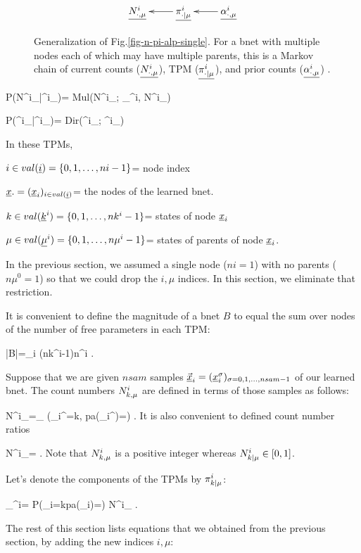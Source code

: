 \begin{figure}[h!]
$$
\xymatrix{
\ul{N^i_\dotmu}
&\ul{\pi^i_\dotbarmu}\ar[l]
&
\ul{\alp^i_\dotmu}\ar[l]
}$$
\caption{
Generalization
of Fig.\ref{fig-n-pi-alp-single}.
For a bnet with multiple nodes
each of which may have multiple parents,
this is  a
Markov chain of
current counts ($\ul{N^i_\dotmu}$),
TPM ($\ul{\pi^i_\dotbarmu}$),
and
prior counts ($\ul{\alp^i_\dotmu}$)
.}
\label{fig-n-pi-alp-many}
\end{figure}

\beq\color{blue}
P(N^i_\dotmu|\pi^i_\dotbarmu)=
Mul(N^i_\dotmu;
\pi_\dotbarmu^i, N^i_\plusmu)
\eeq

\beq\color{blue}
P(\pi^i_\dotbarmu|\alp^i_\dotmu)=
Dir(\pi^i_\dotbarmu; \alp^i_\dotmu)
\eeq

In these TPMs,

$i\in
val(\rvi)=\{0, 1, \dots, ni-1\}$= node index

$\rvx.=(\rvx_i)_{i\in val(\rvi)}$= the
nodes of the learned bnet.

$k\in
val(\rvk^i)=\{0, 1, \dots, nk^i-1\}$= states
of node $\rvx_i$

$\mu\in
val(\ul{\mu}^i)=\{0, 1, \dots, n\mu^i-1\}$=
states of parents of node $\rvx_i$.

In the previous section,
we assumed a single node ($ni=1$)
with no parents ($n\mu^0=1$)
so that 
we could drop  the $i, \mu$
indices.
In this section, we eliminate
that restriction.


It is 
convenient
to define the magnitude of a  bnet
 $B$
to equal the sum
over nodes of the number 
of free parameters in each TPM:

\beq
|B|=\sum_i
(nk^i-1)n\mu^i
\;.
\eeq

Suppose that 
we are given $nsam$ samples 
$
\vec{\rvx}_i=
(\rvx_i^\s)_
{\sigma=0, 1, \ldots, nsam-1}
$ of 
our learned bnet. The count numbers
$N^i_{k,\mu}$ are defined 
in terms of those samples 
as follows:
 

\beq
N^i_\kmu=\sum_\sigma
\indi(\rvx_i^\s=k, pa(\rvx_i^\s)=\mu )
\;.
\eeq
It is also convenient
to
defined
count number ratios

\beq
N^i_\kbarmu=
\;.
\eeq
Note that
$N^i_{k,\mu}$
is a positive integer whereas
$N^i_{k|\mu}\in[0,1]$.

Let's denote
the components of the TPMs by
$\pi^i_{k|\mu}$:


\beq
\pi_\kbarmu^i=
P(\rvx_i=k\cond pa(\rvx_i)=\mu )
\approx
N^i_\kbarmu
\;.
\eeq


The rest
of this section
lists equations that
we obtained 
from the previous
section, by adding the new indices
$i, \mu$:

